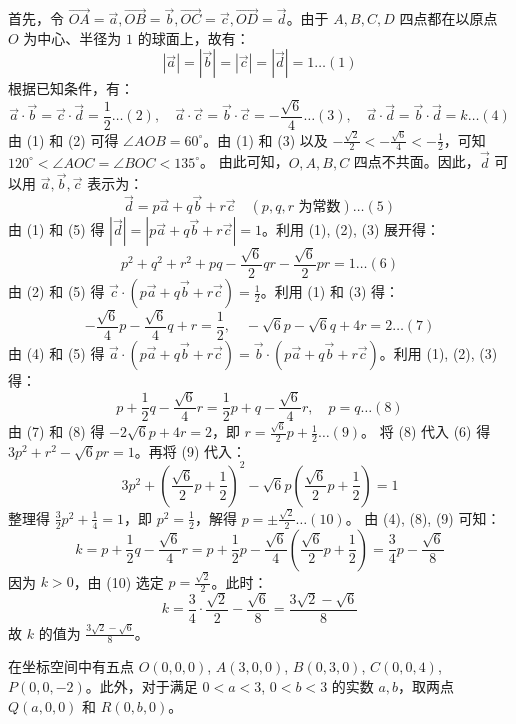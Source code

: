 \begin{questions}
\begin{solution}
首先，令 $\vec{OA} = \vec{a}, \vec{OB} = \vec{b}, \vec{OC} = \vec{c}, \vec{OD} = \vec{d}$。由于 $A, B, C, D$ 四点都在以原点 $O$ 为中心、半径为 $1$ 的球面上，故有：
\[ |\vec{a}| = |\vec{b}| = |\vec{c}| = |\vec{d}| = 1 \dots (1) \]
根据已知条件，有：
\[ \vec{a} \cdot \vec{b} = \vec{c} \cdot \vec{d} = \frac{1}{2} \dots (2), \quad \vec{a} \cdot \vec{c} = \vec{b} \cdot \vec{c} = -\frac{\sqrt{6}}{4} \dots (3), \quad \vec{a} \cdot \vec{d} = \vec{b} \cdot \vec{d} = k \dots (4) \]
由 (1) 和 (2) 可得 $\angle AOB = 60^\circ$。由 (1) 和 (3) 以及 $-\frac{\sqrt{2}}{2} < -\frac{\sqrt{6}}{4} < -\frac{1}{2}$，可知 $120^\circ < \angle AOC = \angle BOC < 135^\circ$。
由此可知，$O, A, B, C$ 四点不共面。因此，$\vec{d}$ 可以用 $\vec{a}, \vec{b}, \vec{c}$ 表示为：
\[ \vec{d} = p\vec{a} + q\vec{b} + r\vec{c} \quad (p, q, r \text{ 为常数}) \dots (5) \]
由 (1) 和 (5) 得 $|\vec{d}| = |p\vec{a} + q\vec{b} + r\vec{c}| = 1$。利用 (1), (2), (3) 展开得：
\[ p^2 + q^2 + r^2 + pq - \frac{\sqrt{6}}{2}qr - \frac{\sqrt{6}}{2}pr = 1 \dots (6) \]
由 (2) 和 (5) 得 $\vec{c} \cdot (p\vec{a} + q\vec{b} + r\vec{c}) = \frac{1}{2}$。利用 (1) 和 (3) 得：
\[ -\frac{\sqrt{6}}{4}p - \frac{\sqrt{6}}{4}q + r = \frac{1}{2}, \quad -\sqrt{6}p - \sqrt{6}q + 4r = 2 \dots (7) \]
由 (4) 和 (5) 得 $\vec{a} \cdot (p\vec{a} + q\vec{b} + r\vec{c}) = \vec{b} \cdot (p\vec{a} + q\vec{b} + r\vec{c})$。利用 (1), (2), (3) 得：
\[ p + \frac{1}{2}q - \frac{\sqrt{6}}{4}r = \frac{1}{2}p + q - \frac{\sqrt{6}}{4}r, \quad p = q \dots (8) \]
由 (7) 和 (8) 得 $-2\sqrt{6}p + 4r = 2$，即 $r = \frac{\sqrt{6}}{2}p + \frac{1}{2} \dots (9)$。
将 (8) 代入 (6) 得 $3p^2 + r^2 - \sqrt{6}pr = 1$。再将 (9) 代入：
\[ 3p^2 + \left(\frac{\sqrt{6}}{2}p + \frac{1}{2}\right)^2 - \sqrt{6}p\left(\frac{\sqrt{6}}{2}p + \frac{1}{2}\right) = 1 \]
整理得 $\frac{3}{2}p^2 + \frac{1}{4} = 1$，即 $p^2 = \frac{1}{2}$，解得 $p = \pm \frac{\sqrt{2}}{2} \dots (10)$。
由 (4), (8), (9) 可知：
\[ k = p + \frac{1}{2}q - \frac{\sqrt{6}}{4}r = p + \frac{1}{2}p - \frac{\sqrt{6}}{4}\left(\frac{\sqrt{6}}{2}p + \frac{1}{2}\right) = \frac{3}{4}p - \frac{\sqrt{6}}{8} \]
因为 $k > 0$，由 (10) 选定 $p = \frac{\sqrt{2}}{2}$。此时：
\[ k = \frac{3}{4} \cdot \frac{\sqrt{2}}{2} - \frac{\sqrt{6}}{8} = \frac{3\sqrt{2} - \sqrt{6}}{8} \]
故 $k$ 的值为 $\frac{3\sqrt{2} - \sqrt{6}}{8}$。
\end{solution}

\question
在坐标空间中有五点 $O(0, 0, 0)$, $A(3, 0, 0)$, $B(0, 3, 0)$, $C(0, 0, 4)$, $P(0, 0, -2)$。此外，对于满足 $0 < a < 3$, $0 < b < 3$ 的实数 $a, b$，取两点 $Q(a, 0, 0)$ 和 $R(0, b, 0)$。
\begin{parts}

\end{parts}
\end{questions}
